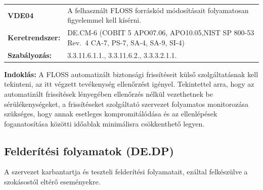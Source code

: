\documentclass[12pt,magyar,a4paper,oneside]{scrreprt}
\begin{document}
\begin{longtable}[]{@{}ll@{}}
\toprule
\endhead
\begin{minipage}[t]{0.16\columnwidth}\raggedright
\textbf{VDE04}\strut
\end{minipage} & \begin{minipage}[t]{0.79\columnwidth}\raggedright
A felhasznált FLOSS forráskód módosításait folyamatosan figyelemmel kell
kísérni.\strut
\end{minipage}\tabularnewline
\begin{minipage}[t]{0.16\columnwidth}\raggedright
\textbf{Keretrendszer:}\strut
\end{minipage} & \begin{minipage}[t]{0.79\columnwidth}\raggedright
DE.CM-6 (COBIT 5 APO07.06, APO10.05,NIST SP 800-53 Rev.~4 CA-7, PS-7,
SA-4, SA-9, SI-4)\strut
\end{minipage}\tabularnewline
\begin{minipage}[t]{0.16\columnwidth}\raggedright
\textbf{Szabályozás:}\strut
\end{minipage} & \begin{minipage}[t]{0.79\columnwidth}\raggedright
3.3.11.6.1.1., 3.3.11.6.2., 3.3.3.2.1.1.\strut
\end{minipage}\tabularnewline
\bottomrule
\end{longtable}

\textbf{Indoklás: } A FLOSS automatizált biztonsági frissítéseit külső
szolgáltatásnak kell tekinteni, az itt végzett tevékenység ellenőrzést
igényel. Tekintettel arra, hogy az automatizált frissítések lényegében
ellenőrzés nélkül vezethetnek be sérülékenységeket, a frissítéseket
szolgáltató szervezet folyamatos monitorozása szükséges, hogy annak
esetleges kompromitálódása és az ellenlépések foganatosítása közötti
időablak minimálisra csökkenthető legyen.

\hypertarget{felderuxedtuxe9si-folyamatok-de.dp}{%
\subsection{Felderítési folyamatok
(DE.DP)}\label{felderuxedtuxe9si-folyamatok-de.dp}}

A szervezet karbantartja és teszteli felderítési folyamatait, ezáltal
felkészülve a szokásostól eltérő eseményekre.
\end{document}
